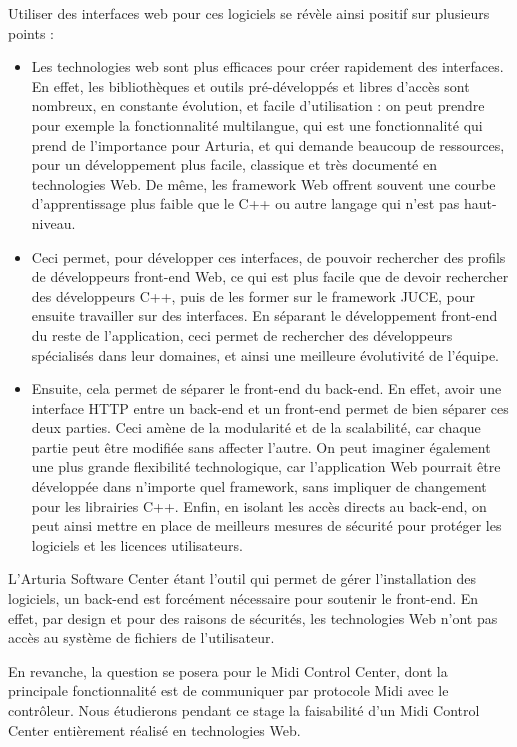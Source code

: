 \documentclass[francais]{rapportPFE}  %
\begin{document}
Utiliser des interfaces web pour ces logiciels se révèle ainsi positif sur plusieurs points : 
\begin{itemize}
	\item Les technologies web sont plus efficaces pour créer rapidement des interfaces. En effet, les bibliothèques et outils pré-développés et libres d'accès sont nombreux, en constante évolution, et facile d'utilisation : on peut prendre pour exemple la fonctionnalité multilangue, qui est une fonctionnalité qui prend de l'importance pour Arturia, et qui demande beaucoup de ressources, pour un développement plus facile, classique et très documenté en technologies Web. De même, les framework Web offrent souvent une courbe d'apprentissage plus faible que le C++ ou autre langage qui n'est pas haut-niveau.
	\item Ceci permet, pour développer ces interfaces, de pouvoir rechercher des profils de développeurs front-end Web, ce qui est plus facile que de devoir rechercher des développeurs C++, puis de les former sur le framework JUCE, pour ensuite travailler sur des interfaces. En séparant le développement front-end du reste de l'application, ceci permet de rechercher des développeurs spécialisés dans leur domaines, et ainsi une meilleure évolutivité de l'équipe.
	\item Ensuite, cela permet de séparer le front-end du back-end. En effet, avoir une interface HTTP entre un back-end et un front-end permet de bien séparer ces deux parties. Ceci amène de la modularité et de la scalabilité, car chaque partie peut être modifiée sans affecter l'autre. On peut imaginer également une plus grande flexibilité technologique, car l'application Web pourrait être développée dans n'importe quel framework, sans impliquer de changement pour les librairies C++. Enfin, en isolant les accès directs au back-end, on peut ainsi mettre en place de meilleurs mesures de sécurité pour protéger les logiciels et les licences utilisateurs.
\end{itemize}

L'Arturia Software Center étant l'outil qui permet de gérer l'installation des logiciels, un back-end est forcément nécessaire pour soutenir le front-end. En effet, par design et pour des raisons de sécurités, les technologies Web n'ont pas accès au système de fichiers de l'utilisateur.

En revanche, la question se posera pour le Midi Control Center, dont la principale fonctionnalité est de communiquer par protocole Midi avec le contrôleur. Nous étudierons pendant ce stage la faisabilité d'un Midi Control Center entièrement réalisé en technologies Web.
\end{document}
